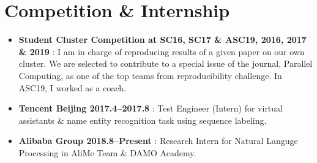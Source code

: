 \documentclass[letterpaper]{article}
\begin{document}
\section*{Competition \& Internship}
\begin{itemize}
  \item \textbf{Student Cluster Competition at SC16, SC17 \& ASC19, 2016, 2017 \& 2019} : I am in charge of reproducing results of a given paper on our own cluster. We are selected to contribute to a special issue of the journal, Parallel Computing, as one of the top teams from reproducibility challenge. In ASC19, I worked as a coach.
  \item \textbf{Tencent Beijing 2017.4--2017.8} : Test Engineer (Intern) for virtual assistants \& name entity recognition task using sequence labeling.
  \item \textbf{Alibaba Group 2018.8--Present} : Research Intern for Natural Languge Processing in AliMe Team \& DAMO Academy.
\end{itemize}
\end{document}
